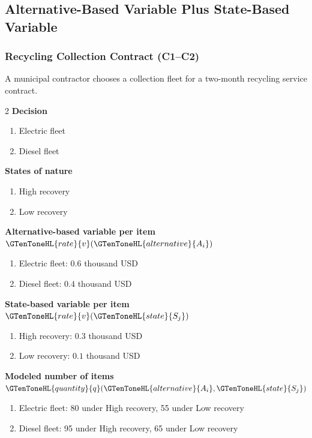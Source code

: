 \subsection{Alternative-Based Variable Plus State-Based Variable}
	\label{sec:alternative-based-variable-payoff-plus-state-based-variable-payoff}


	\subsubsection{Recycling Collection Contract (C1--C2)}
	\label{sec:problem14-recycling-collection-contract-c1-c2}
	A municipal contractor chooses a collection fleet for a two-month recycling service contract.
	\begin{multicols}{2}
	\textbf{Decision }
	\begin{enumerate}[label=\arabic*.]
\item Electric fleet
\item Diesel fleet
	\end{enumerate}
	\textbf{States of nature}
	\begin{enumerate}[label=\arabic*.]
\item High recovery
\item Low recovery
	\end{enumerate}
	\columnbreak
	\textbf{Alternative-based variable  per item $\GTenToneHL{rate}{v}(\GTenToneHL{alternative}{A_i})$}
\begin{enumerate}[label=\arabic*.]
\item Electric fleet: $0.6$ thousand USD
\item Diesel fleet: $0.4$ thousand USD\end{enumerate}
\textbf{State-based variable  per item $\GTenToneHL{rate}{v}(\GTenToneHL{state}{S_j})$}
\begin{enumerate}[label=\arabic*.]
\item High recovery: $0.3$ thousand USD
\item Low recovery: $0.1$ thousand USD\end{enumerate}
\textbf{Modeled number of items $\GTenToneHL{quantity}{q}(\GTenToneHL{alternative}{A_i},\GTenToneHL{state}{S_j})$}
\begin{enumerate}[label=\arabic*.]
\item Electric fleet: 80 under High recovery, 55 under Low recovery
\item Diesel fleet: 95 under High recovery, 65 under Low recovery
\end{enumerate}
	\end{multicols}

